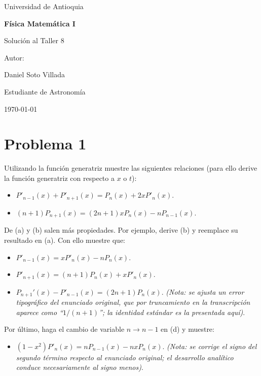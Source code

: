 \documentclass[a4paper]{article}
\begin{document}
\begin{titlepage}
  \centering
  {\Large Universidad de Antioquia\par}
  \vspace{2cm}
  {\huge\bfseries Física Matemática I\par}
  \vspace{0.4cm}
  {\Large Solución al Taller 8 \par}
  \vspace{2.5cm}
  {\large Autor:\par}
  \vspace{0.2cm}
  {\large Daniel Soto Villada\par}
  {\large Estudiante de Astronomía\par}
  \vfill
  {\large \today\par}
\end{titlepage}

\newpage
\tableofcontents
\newpage





\section{Problema 1}
Utilizando la función generatriz muestre las siguientes relaciones (para ello derive la función generatriz con respecto a $x$ o $t$):
\begin{itemize}
    \item[a)] $P'_{n-1}(x) + P'_{n+1}(x) = P_n(x) + 2x P'_n(x)$.
    \item[b)] $(n+1)P_{n+1}(x) = (2n+1)x P_n(x) - n P_{n-1}(x)$.
\end{itemize}
De (a) y (b) salen más propiedades. Por ejemplo, derive (b) y reemplace su resultado en (a). Con ello muestre que:
\begin{itemize}
    \item[c)] $P'_{n-1}(x) = x P'_n(x) - n P_n(x)$.
    \item[d)] $P'_{n+1}(x) = (n+1)P_n(x) + x P'_n(x)$.
    \item[e)] $P_{n+1}'(x) - P'_{n-1}(x) = (2n+1)P_n(x)$. \textit{(Nota: se ajusta un error tipográfico del enunciado original, que por truncamiento en la transcripción aparece como ``$1/(n+1)$''; la identidad estándar es la presentada aquí)}.
\end{itemize}
Por último, haga el cambio de variable $n \to n-1$ en (d) y muestre:
\begin{itemize}
    \item[f)] $(1-x^2)P'_n(x) = n P_{n-1}(x) - n x P_n(x)$. \textit{(Nota: se corrige el signo del segundo término respecto al enunciado original; el desarrollo analítico conduce necesariamente al signo menos)}.
\end{itemize}
\end{document}
